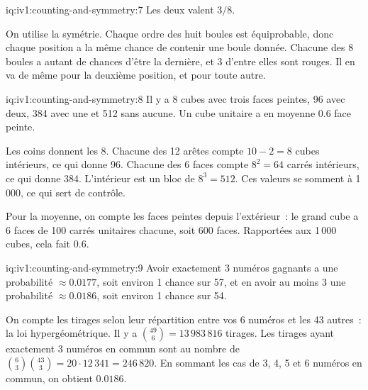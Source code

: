 \begin{solution}{iq:iv1:counting-and-symmetry:7}
Les deux valent $3/8$.

On utilise la symétrie. Chaque ordre des huit boules est équiprobable, donc chaque position a la même chance de contenir une boule donnée. Chacune des 8 boules a autant de chances d'être la dernière, et 3 d'entre elles sont rouges. Il en va de même pour la deuxième position, et pour toute autre.

\end{solution}

\begin{solution}{iq:iv1:counting-and-symmetry:8}
Il y a 8 cubes avec trois faces peintes, 96 avec deux, 384 avec une et 512 sans aucune. Un cube unitaire a en moyenne $0.6$ face peinte.

Les coins donnent les 8. Chacune des 12 arêtes compte $10 - 2 = 8$ cubes intérieurs, ce qui donne 96. Chacune des 6 faces compte $8^2 = 64$ carrés intérieurs, ce qui donne 384. L'intérieur est un bloc de $8^3 = 512$. Ces valeurs se somment à 1\,000, ce qui sert de contrôle.

Pour la moyenne, on compte les faces peintes depuis l'extérieur~: le grand cube a 6 faces de 100 carrés unitaires chacune, soit 600 faces. Rapportées aux 1\,000 cubes, cela fait $0.6$.

\end{solution}

\begin{solution}{iq:iv1:counting-and-symmetry:9}
Avoir exactement 3 numéros gagnants a une probabilité $\approx 0.0177$, soit environ 1 chance sur 57, et en avoir au moins 3 une probabilité $\approx 0.0186$, soit environ 1 chance sur 54.

On compte les tirages selon leur répartition entre vos 6 numéros et les 43 autres~: la loi hypergéométrique. Il y a $\binom{49}{6} = 13\,983\,816$ tirages. Les tirages ayant exactement 3 numéros en commun sont au nombre de $\binom{6}{3}\binom{43}{3} = 20 \cdot 12\,341 = 246\,820$. En sommant les cas de 3, 4, 5 et 6 numéros en commun, on obtient $0.0186$.

\end{solution}

